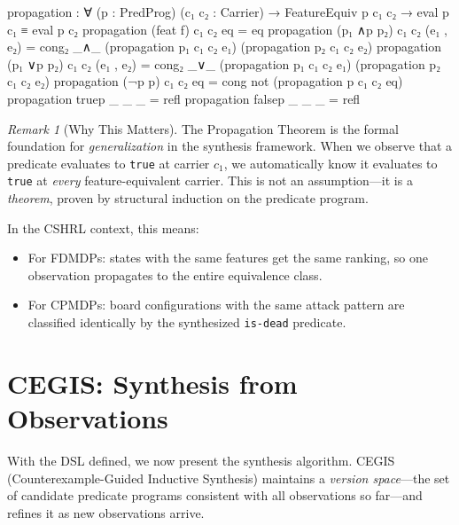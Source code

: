 \documentclass[9pt,a4paper]{article}
\theoremstyle{plain}
\theoremstyle{definition}
\theoremstyle{remark}
\newtheorem{remark}{Remark}
\begin{document}
\begin{code}
  propagation : ∀ (p : PredProg) (c₁ c₂ : Carrier) →
    FeatureEquiv p c₁ c₂ →
    eval p c₁ ≡ eval p c₂
  propagation (feat f)    c₁ c₂ eq         = eq
  propagation (p₁ ∧p p₂) c₁ c₂ (e₁ , e₂) =
    cong₂ _∧_ (propagation p₁ c₁ c₂ e₁) (propagation p₂ c₁ c₂ e₂)
  propagation (p₁ ∨p p₂) c₁ c₂ (e₁ , e₂) =
    cong₂ _∨_ (propagation p₁ c₁ c₂ e₁) (propagation p₂ c₁ c₂ e₂)
  propagation (¬p p)      c₁ c₂ eq         =
    cong not (propagation p c₁ c₂ eq)
  propagation truep       _  _  _           = refl
  propagation falsep      _  _  _           = refl
\end{code}

\begin{remark}[Why This Matters]
The Propagation Theorem is the formal foundation for \emph{generalization} in the synthesis framework.  When we observe that a predicate evaluates to \texttt{true} at carrier $c_1$, we automatically know it evaluates to \texttt{true} at \emph{every} feature-equivalent carrier.  This is not an assumption---it is a \emph{theorem}, proven by structural induction on the predicate program.

In the CSHRL context, this means:
\begin{itemize}
\item For FDMDPs: states with the same features get the same ranking, so one observation propagates to the entire equivalence class.
\item For CPMDPs: board configurations with the same attack pattern are classified identically by the synthesized \texttt{is-dead} predicate.
\end{itemize}
\end{remark}



\section{CEGIS: Synthesis from Observations}
\label{sec:cegis}

With the DSL defined, we now present the synthesis algorithm.  CEGIS (Counterexample-Guided Inductive Synthesis) maintains a \emph{version space}---the set of candidate predicate programs consistent with all observations so far---and refines it as new observations arrive.
\end{document}
